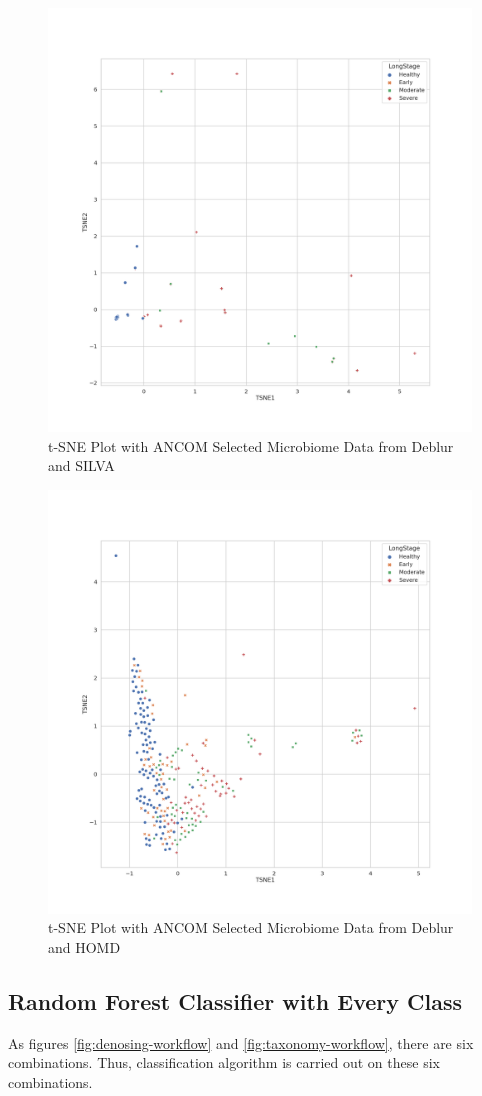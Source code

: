 \documentclass[a4paper]{article}
\begin{document}
            \begin{figure}[p]
                \centering
                \includegraphics[width=0.6 \linewidth]{figures/tSNE/ANCOM/ANCOM.Deblur.silva.png}
                \caption{t-SNE Plot with ANCOM Selected Microbiome Data from Deblur and SILVA}
                \label{fig:tsne-ANCOM-deblur-silva}
            \end{figure}

            \begin{figure}[p]
                \centering
                \includegraphics[width=0.6 \linewidth]{figures/tSNE/ANCOM/ANCOM.Deblur.homd.png}
                \caption{t-SNE Plot with ANCOM Selected Microbiome Data from Deblur and HOMD}
                \label{fig:tsne-ANCOM-deblur-homd}
            \end{figure}

        \subsection{Random Forest Classifier with Every Class}
            As figures \ref{fig:denosing-workflow} and \ref{fig:taxonomy-workflow}, there are six combinations. Thus, classification algorithm is carried out on these six combinations.
\end{document}
